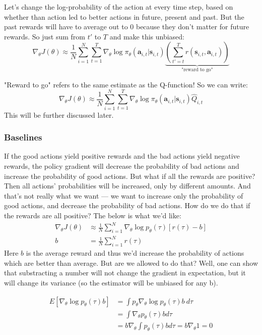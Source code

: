\documentclass{report}
\begin{document}
Let's change the log-probability of the action at every time step,
based on whether than action led to better actions in future, present and past.
But the past rewards will have to average out to 0 because they don't matter for future rewards.
So just sum from $t'$ to $T$ and make this unbiased:
\begin{equation}
		\label{eq:reward_to_go}
		\nabla_\theta J(\theta) \approx 
		\frac{1}{N} \sum_{i=1}^{N} \sum_{t=1}^{T} \nabla_\theta \log \pi_\theta (\bm{a}_{i,t}| \bm{s}_{i,t})
		\underbrace{\left ( \sum_{t'=t}^{T} r (\bm{s}_{i,t}, \bm{a}_{i,t}) \right )}_{\text{"reward to go"}}
\end{equation}

"Reward to go" refers to the same estimate as the Q-function!
So we can write:
\begin{equation}
		\nabla_\theta J(\theta) \approx 
		\frac{1}{N} \sum_{i=1}^{N} \sum_{t=1}^{T} \nabla_\theta \log \pi_\theta (\bm{a}_{i,t}| \bm{s}_{i,t})
		\hat{Q}_{i,t} 
\end{equation}
This will be further discussed later.

\subsubsection{Baselines}
If the good actions yield positive rewards and the bad actions yield negative rewards,
the policy gradient will decrease the probability of bad actions and increase the probability 
of good actions.
But what if all the rewards are positive?
Then all actions' probabilities will be increased, only by different amounts.
And that's not really what we want --- we want to increase only the probability of good actions,
and decrease the probability of bad actions.
How do we do that if the rewards are all positive?
The below is what we'd like:
\begin{align}
		\nabla_\theta J(\theta) &\approx 
		\frac{1}{N} \sum_{i=1}^{N}
		\nabla_\theta \log p_\theta (\tau) [ r(\tau) - b] \\
		b &= \frac{1}{N} \sum_{i=1}^{N} r(\tau)
\end{align}
Here $b$ is the average reward and thus we'd increase the probability of
actions which are better than average.
But are we allowed to do that?
Well, one can show that substracting a number will not change the gradient in expectation,
but it will change its variance (so the estimator will be unbiased for any b).

\begin{align}
E \left [ \nabla_\theta \log p_\theta (\tau) b \right ] &=
\int{p_\theta \nabla_\theta \log p_\theta (\tau) b}  \: d{\tau}  \\
 & =
\int{ \nabla_\theta p_\theta (\tau) b } d{\tau}  \\
 &= 
b \nabla_\theta \int { p_\theta (\tau) b } d{\tau} = b \nabla_\theta 1 = 0
\end{align}
\end{document}
